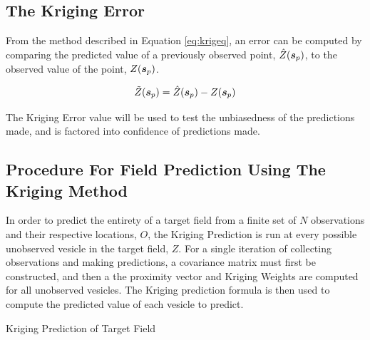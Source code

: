 \documentclass[11pt]{ucthesis}
\makeatletter
\def\BState{\State\hskip-\ALG@thistlm}
\newcommand{\vect}[1]{{\it{\boldsymbol{#1}}}}
\makeatother
\begin{document}
\subsection{The Kriging Error}
From the method described in Equation \ref{eq:krigeq}, an error can be computed by comparing the predicted value of a previously observed point, $\hat{Z}(\vect{s}_p)$, to the observed value of the point, $Z(\vect{s}_p)$.

\begin{equation}
    \tilde{Z}(\vect{s}_p) = \hat{Z}(\vect{s}_p) - Z(\vect{s}_p) 
    \label{eq:krigerr}
\end{equation}

The Kriging Error value will be used to test the unbiasedness of the predictions made, and is factored into confidence of predictions made.

\subsection{Procedure For Field Prediction Using The Kriging Method}
In order to predict the entirety of a target field from a finite set of $N$ observations and their respective locations, $O$, the Kriging Prediction is run at every possible unobserved vesicle in the target field, $Z$. For a single iteration of collecting observations and making predictions, a covariance matrix must first be constructed, and then a the proximity vector and Kriging Weights are computed for all unobserved vesicles. The Kriging prediction formula is then used to compute the predicted value of each vesicle to predict.

\begin{algorithm}[thpb!]
\caption{Kriging Prediction of Target Field}\label{alg:krig}
\end{algorithm}
\end{document}
